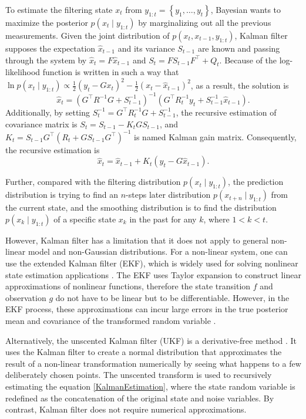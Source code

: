 To estimate the filtering state $x_t$ from $y_{1:t}=\left\lbrace y_1,\ldots,y_t\right\rbrace$, Bayesian wants to maximize the posterior $p(x_t\mid y_{1:t})$ by marginalizing out all the previous measurements. Given the joint distribution of $p(x_t,x_{t-1},y_{1:t})$, Kalman filter supposes the expectation $\hat{x}_{t-1}$ and its variance $S_{t-1}$ are known and passing through the system by $\hat{x}_t=F\hat{x}_{t-1}$ and $S_t=FS_{t-1}F^\top + Q_t$. Because of the log-likelihood function is written in such a way that
$\ln p(x_t\mid y_{1:t}) \propto \frac{1}{2}(y_t-Gx_t)^2-\frac{1}{2}(x_t-\hat{x}_{t-1})^2$,
as a result, the solution is 
\begin{equation*}
\hat{x}_t = \left(G^\top R^{-1}G+S_{t-1}^{-1}\right)^{-1}\left( G^\top R_t^{-1}y_t+S_{t-1}^{-1}\hat{x}_{t-1} \right).
\end{equation*}
Additionally, by setting $S_t^{-1} = G^\top R_t^{-1}G+S_{t-1}^{-1}$, the recursive estimation of covariance matrix is $S_t = S_{t-1} - K_t GS_{t-1}$, 
and $K_t = S_{t-1} G^\top (R_t +GS_{t-1}G^\top)^{-1}$ is named Kalman gain matrix. Consequently, the recursive estimation is 
\begin{equation}\label{KalmanEstimation}
\hat{x}_t = \hat{x}_{t-1}+K_t(y_t-G\hat{x}_{t-1}).
\end{equation}

Further, compared with the filtering distribution $p(x_t\mid y_{1:t})$, the prediction distribution is trying to find an $n$-steps later distribution $p(x_{t+n}\mid y_{1:t})$ from the current state, and the smoothing distribution is to find the distribution $p(x_k\mid y_{1:t})$ of a specific state $x_k$ in the past for any $k$, where $1<k<t$. 

However, Kalman filter has a limitation that it does not apply to general non-linear model and non-Gaussian distributions. For a non-linear system, one can use the extended Kalman filter (EKF), which is widely used for solving nonlinear state estimation applications \citep{gelb1974applied, bar1993estimation}. The EKF uses Taylor expansion to construct linear approximations of nonlinear functions, therefore the state transition $f$ and observation $g$ do not have to be linear but to be differentiable. However, in the EKF process, these approximations can incur large errors in the true posterior mean and covariance of the transformed random variable \citep{wan2000unscented}. 

Alternatively, the unscented Kalman filter (UKF) is a derivative-free method \citep{julier1997new, wan2000unscented, gyorgy2014unscented}. It uses the Kalman filter to create a normal distribution that approximates the result of a non-linear transformation numerically by seeing what happens to a few deliberately chosen points. The unscented transform is used to recursively estimating the equation \eqref{KalmanEstimation}, where the state random variable is redefined as the concatenation of the original state and noise variables. By contrast, Kalman filter does not require numerical approximations. 

